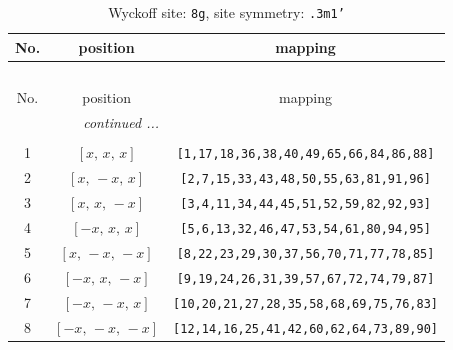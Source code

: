 \documentclass[fleqn,8pt]{jsarticle}
\begin{document}
\begin{longtable}{ccc}
\caption{Wyckoff site: {\tt 8g}, site symmetry: {\tt .3m1'}}
 \\
 \hline \hline
No. & position & mapping \\ \hline \endfirsthead

\multicolumn{2}{l}{\tablename\ \thetable{}} \\
 \hline \hline
No. & position & mapping \\ \hline \endhead

 \hline \hline
\multicolumn{2}{r}{\footnotesize\it continued ...} \\ \endfoot

 \hline \hline
\multicolumn{2}{r}{} \\ \endlastfoot

1 & $\left[ x,\, x,\, x \right]$ & {\tt [1,17,18,36,38,40,49,65,66,84,86,88]} \\ \hline
2 & $\left[ x,\, - x,\, x \right]$ & {\tt [2,7,15,33,43,48,50,55,63,81,91,96]} \\ \hline
3 & $\left[ x,\, x,\, - x \right]$ & {\tt [3,4,11,34,44,45,51,52,59,82,92,93]} \\ \hline
4 & $\left[ - x,\, x,\, x \right]$ & {\tt [5,6,13,32,46,47,53,54,61,80,94,95]} \\ \hline
5 & $\left[ x,\, - x,\, - x \right]$ & {\tt [8,22,23,29,30,37,56,70,71,77,78,85]} \\ \hline
6 & $\left[ - x,\, x,\, - x \right]$ & {\tt [9,19,24,26,31,39,57,67,72,74,79,87]} \\ \hline
7 & $\left[ - x,\, - x,\, x \right]$ & {\tt [10,20,21,27,28,35,58,68,69,75,76,83]} \\ \hline
8 & $\left[ - x,\, - x,\, - x \right]$ & {\tt [12,14,16,25,41,42,60,62,64,73,89,90]} \\
\end{longtable}
\renewcommand{\arraystretch}{1.2}
\end{document}
